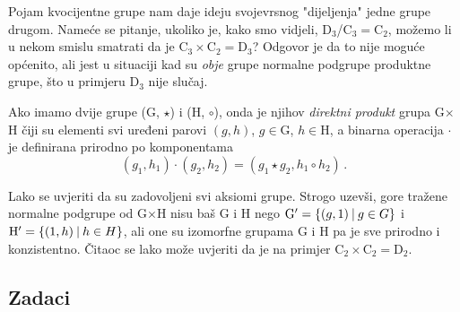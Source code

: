 Pojam kvocijentne grupe nam daje ideju svojevrsnog "dijeljenja" jedne
grupe drugom.
Nameće se pitanje, ukoliko je, kako smo vidjeli, 
$\mathrm{D}_{3}$/$\mathrm{C}_3 = \mathrm{C}_2$, možemo li u nekom smislu
smatrati da je $\mathrm{C}_3 \times \mathrm{C}_2 = \mathrm{D}_3$?
Odgovor je da to nije moguće općenito, ali jest u situaciji kad su
\emph{obje} grupe normalne podgrupe produktne grupe, što u primjeru
$\mathrm{D}_3$ nije slučaj.

\begin{definicija}\label{def:direktniproduktgrupa}
Ako imamo dvije grupe (G, $\star$) i (H, $\circ$), onda je njihov
\emph{direktni produkt} grupa G$\times$H čiji su elementi svi uređeni
parovi $(g, h)$, $g \in \mathrm{G}$, $h \in \mathrm{H}$, a 
binarna operacija $\cdot$ je definirana prirodno po komponentama
\begin{equation}
    (g_1, h_1) \cdot (g_2, h_2) = (g_1 \star g_2, h_1 \circ h_2) \,.
    \label{eq:Gproduct}
\end{equation}
\end{definicija}

Lako se uvjeriti da su zadovoljeni svi aksiomi grupe. Strogo 
uzevši, gore tražene normalne podgrupe od G$\times$H nisu baš G i H nego
    $\mathrm{G}' = \{ (g, 1) \: | \: g \in G \}$ i
    $\mathrm{H}' = \{ (1, h) \: | \: h \in H \}$,
ali one su izomorfne grupama G i H pa je sve prirodno i konzistentno.
Čitaoc se lako može uvjeriti da je na primjer
$\mathrm{C}_2 \times \mathrm{C}_2 = \mathrm{D}_2$.

\subsection*{Zadaci}

